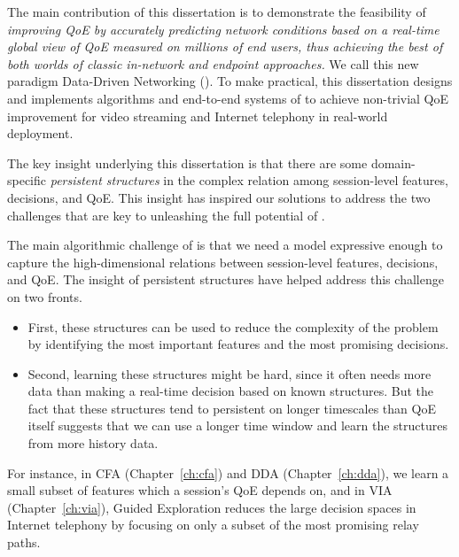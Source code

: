 The main contribution of this dissertation is to demonstrate the
feasibility of {\em improving QoE by accurately predicting network conditions
based on a real-time global view of QoE measured on millions of 
end users, thus achieving 
the best of both worlds of classic in-network and endpoint approaches.}
We call this new paradigm Data-Driven Networking (\ddn).
To make \ddn practical, this dissertation designs 
and implements algorithms and end-to-end systems of \ddn to
achieve non-trivial QoE improvement for video streaming and 
Internet telephony in real-world deployment.

The key insight underlying this dissertation is that there are some 
domain-specific {\em persistent structures} in the complex relation 
among session-level features, decisions, and QoE. 
This insight has inspired our solutions to address the two 
challenges that are key to unleashing the full potential of \ddn.

The main algorithmic challenge of \ddn is that we need a model 
expressive enough to capture the high-dimensional relations 
between session-level features, decisions, and QoE. 
The insight of persistent structures have helped address
this challenge on two fronts.
\begin{itemize}
\item First, these structures can be used to reduce the complexity of 
the problem by identifying the most 
important features and the most promising decisions.
\item Second, learning these structures might be hard, 
since it often needs more data than making a real-time decision 
based on known structures. But the fact that these structures tend
to  persistent on longer timescales than QoE itself
suggests that we can use a longer time window
and learn the structures from more history data.
\end{itemize}
For instance, in CFA (Chapter~\ref{ch:cfa}) and DDA
(Chapter~\ref{ch:dda}), we learn a small 
subset of features which a session's QoE depends on,
and in VIA (Chapter~\ref{ch:via}), Guided Exploration reduces
the large decision spaces in Internet telephony by focusing
on only a subset of the most promising relay paths.



